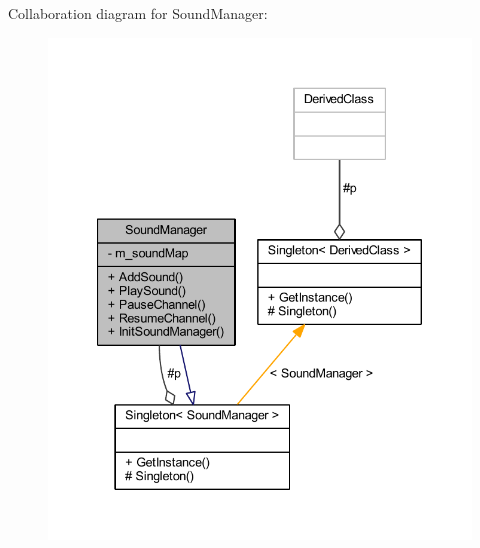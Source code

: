 Collaboration diagram for Sound\+Manager\+:\nopagebreak
\begin{figure}[H]
\begin{center}
\leavevmode
\includegraphics[width=340pt]{class_sound_manager__coll__graph}
\end{center}
\end{figure}
